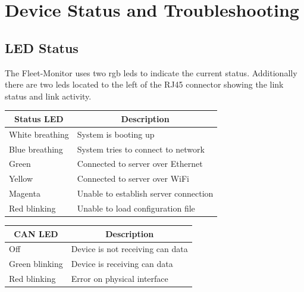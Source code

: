 \section{Device Status and Troubleshooting}


\subsection{LED Status}
The Fleet-Monitor uses two \acrshort{rgb} \acrshort{led}s to indicate the current status. Additionally there are two \acrshort{led}s located to the left of the RJ45 connector showing the link status and link activity.

\begin{center}
    \begin{tabular}{| p{6.4cm} | p{6.4cm} |} \hline
    \multicolumn{1}{|c|}{\textbf{Status LED}} & \multicolumn{1}{c|}{\textbf{Description}}   \\ \hline 
    White breathing                 & System is booting up                                  \\ \hline
    Blue breathing                  & System tries to connect to network                    \\ \hline
    Green                           & Connected to server over Ethernet                     \\ \hline
    Yellow                          & Connected to server over WiFi                         \\ \hline
    Magenta                         & Unable to establish server connection                 \\ \hline
    Red blinking                    & Unable to load configuration file                     \\ \hline
    
    \end{tabular}
\end{center}

\begin{center}
    \begin{tabular}{| p{6.4cm} | p{6.4cm} |} \hline
    \multicolumn{1}{|c|}{\textbf{CAN LED}} & \multicolumn{1}{c|}{\textbf{Description}}      \\ \hline 
    Off                             & Device is not receiving \acrshort{can} data           \\ \hline
    Green blinking                  & Device is receiving \acrshort{can} data               \\ \hline
    Red blinking                    & Error on physical interface                           \\ \hline
    \end{tabular}
\end{center}
\newpage

